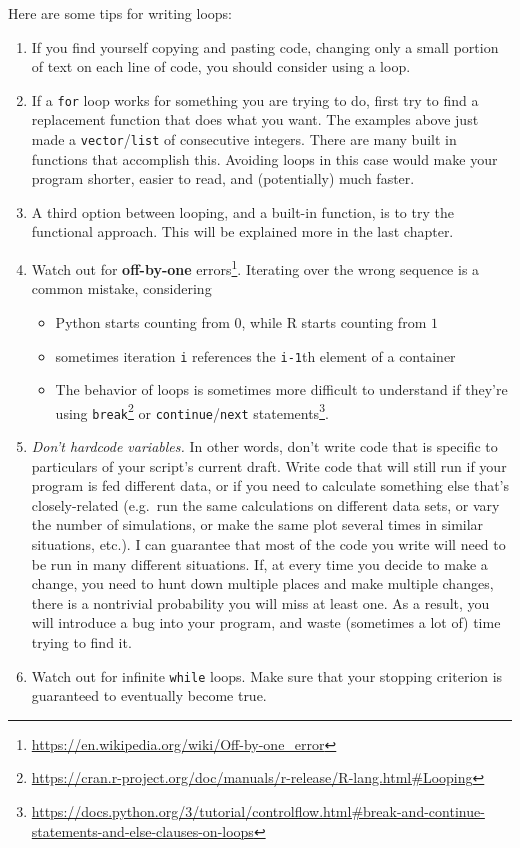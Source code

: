 \documentclass[
  12pt,
  krantz2]{krantz}
\providecommand{\tightlist}{%
  \setlength{\itemsep}{0pt}\setlength{\parskip}{0pt}}
\renewcommand{\href}[2]{#2\footnote{\url{#1}}}
\begin{document}
\begin{rmd-caution}

Here are some tips for writing loops:

\begin{enumerate}
\def\labelenumi{\arabic{enumi}.}
\tightlist
\item
  If you find yourself copying and pasting code, changing only a small portion of text on each line of code, you should consider using a loop.
\item
  If a \texttt{for} loop works for something you are trying to do, first try to find a replacement function that does what you want. The examples above just made a \texttt{vector}/\texttt{list} of consecutive integers. There are many built in functions that accomplish this. Avoiding loops in this case would make your program shorter, easier to read, and (potentially) much faster.
\item
  A third option between looping, and a built-in function, is to try the functional approach. This will be explained more in the last chapter.
\item
  Watch out for \href{https://en.wikipedia.org/wiki/Off-by-one_error}{\textbf{off-by-one} errors}. Iterating over the wrong sequence is a common mistake, considering

  \begin{itemize}
  \tightlist
  \item
    Python starts counting from \(0\), while R starts counting from \(1\)
  \item
    sometimes iteration \texttt{i} references the \texttt{i-1}th element of a container
  \item
    The behavior of loops is sometimes more difficult to understand if they're using \href{https://cran.r-project.org/doc/manuals/r-release/R-lang.html\#Looping}{\texttt{break}} or \href{https://docs.python.org/3/tutorial/controlflow.html\#break-and-continue-statements-and-else-clauses-on-loops}{\texttt{continue}/\texttt{next} statements}.
  \end{itemize}
\item
  \emph{Don't hardcode variables.} In other words, don't write code that is specific to particulars of your script's current draft. Write code that will still run if your program is fed different data, or if you need to calculate something else that's closely-related (e.g.~run the same calculations on different data sets, or vary the number of simulations, or make the same plot several times in similar situations, etc.). I can guarantee that most of the code you write will need to be run in many different situations. If, at every time you decide to make a change, you need to hunt down multiple places and make multiple changes, there is a nontrivial probability you will miss at least one. As a result, you will introduce a bug into your program, and waste (sometimes a lot of) time trying to find it.
\item
  Watch out for infinite \texttt{while} loops. Make sure that your stopping criterion is guaranteed to eventually become true.
\end{enumerate}

\end{rmd-caution}
\end{document}
